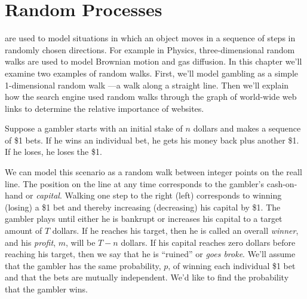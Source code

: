\chapter{Random Processes}\label{ran_process_chap}

 are used to model situations in which an object moves
in a sequence of steps in randomly chosen directions.  For example in
Physics, three-dimensional random walks are used to model Brownian motion
and gas diffusion.  In this chapter we'll examine two examples of random
walks.  First, we'll model gambling as a simple 1-dimensional random walk
---a walk along a straight line.  Then we'll explain how the 
search engine used random walks through the graph of world-wide web links
to determine the relative importance of websites.

Suppose a gambler starts with an initial stake of $n$ dollars and makes a
sequence of \$1 bets.  If he wins an individual bet, he gets his money
back plus another \$1.  If he loses, he loses the \$1.  

We can model this scenario as a random walk between integer points on
the reall line.  The position on the line at any time corresponds to
the gambler's cash-on-hand or \emph{capital}.  Walking one step to the
right (left) corresponds to winning (losing) a \$1 bet and thereby
increasing (decreasing) his capital by \$1.  The gambler plays until
either he is bankrupt or increases his capital to a target amount of
$T$ dollars.  If he reaches his target, then he is called an overall
\emph{winner}, and his \emph{profit}, $m$, will be $T-n$ dollars.  If
his capital reaches zero dollars before reaching his target, then we
say that he is ``ruined'' or \emph{goes broke}.  We'll assume that the
gambler has the same probability, $p$, of winning each individual \$1
bet and that the bets are mutually independent.  We'd like to find the
probability that the gambler wins.

